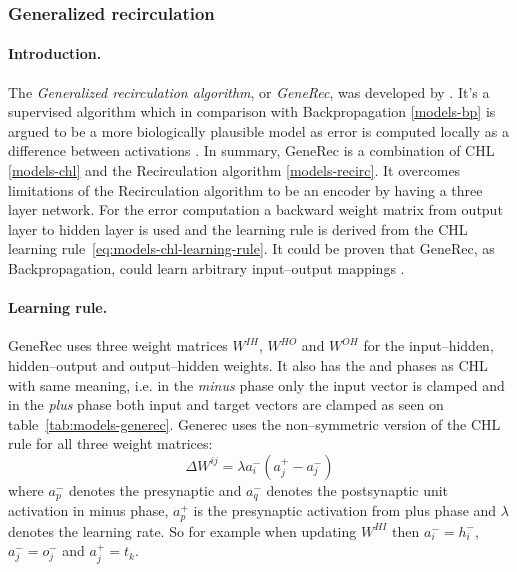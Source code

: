 \subsubsection{Generalized recirculation}
\label{models-generec} 

\paragraph{Introduction.} 
The \emph{Generalized recirculation algorithm}, or \emph{GeneRec}, was developed by \citet{o1996bio}. It's a supervised algorithm which in comparison with Backpropagation \ref{models-bp} is argued to be a more biologically plausible model as error is computed locally as a difference between activations \citep{o1998six, o2001generalization, da2011advances, schneider2009application}. In summary, GeneRec is a combination of CHL \ref{models-chl} and the Recirculation algorithm \ref{models-recirc}. It overcomes limitations of the Recirculation algorithm to be an encoder by having a three layer network. For the error computation a backward weight matrix from output layer to hidden layer is used and the learning rule is derived from the CHL learning rule~\ref{eq:models-chl-learning-rule}. It could be proven that GeneRec, as Backpropagation, could learn arbitrary input--output mappings \citep{o1996bio}. 

\paragraph{Learning rule.} 
GeneRec uses three weight matrices $W^{IH}$, $W^{HO}$ and $W^{OH}$ for the input--hidden, hidden--output and output--hidden weights. It also has the \quotes{-} and \quotes{+} phases as CHL with same meaning, i.e. in the \emph{minus} phase only the input vector is clamped and in the \emph{plus} phase both input and target vectors are clamped as seen on table~\ref{tab:models-generec}. Generec uses the non--symmetric version of the CHL rule for all three weight matrices: 
\begin{equation}
  \label{eq:models-generec-learning-rule}
  \Delta W^{ij} = \lambda a^{-}_i(a^{+}_j - a^{-}_j)
\end{equation}
where $a^{-}_p$ denotes the presynaptic and $a^{-}_q$ denotes the postsynaptic unit activation in minus phase, $a^{+}_p$ is the presynaptic activation from plus phase and $\lambda$ denotes the learning rate. So for example when updating $W^{HI}$ then $a^{-}_i = h^{-}_i$, $a^{-}_j = o^{-}_j$ and $a^{+}_j = t_k$. 


